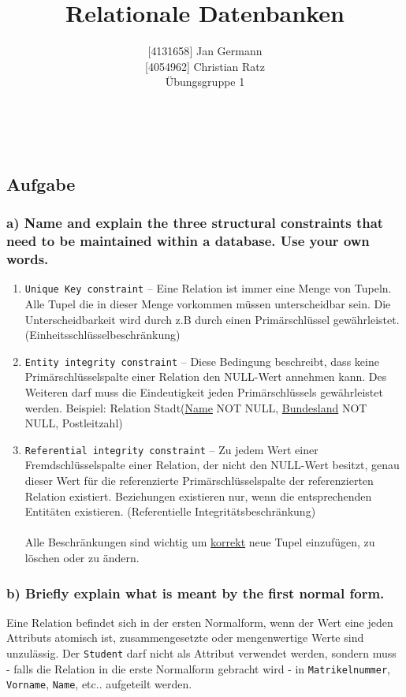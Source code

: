 \documentclass[11pt,a4paper,DIV=9]{scrartcl}
\author{{[}4131658{]} Jan Germann \\{[}4054962{]} Christian Ratz\\Übungsgruppe 1}
\title{Relationale Datenbanken}
\newcounter{temp}
\newcommand{\aufgabe}[1]{
  \setcounter{temp}{\value{subsection}}
  \setcounter{subsection}{#1}
  \addtocounter{subsection}{-1}
  \subsection{Aufgabe}
  \setcounter{subsection}{\value{temp}}
}
\newcommand{\teil}[2][]{
  \subsubsection*{#2) #1}
}
\renewcommand{\author}[1]{\renewcommand{\author}{#1}}
\renewcommand{\title}[1]{\renewcommand{\title}{#1}}
\newcommand{\makehomeworktitle}{
  \begin{minipage}[t]{6.5cm}
    \sf{\author}
  \end{minipage}
  \begin{minipage}[t]{6.5cm}
    \begin{flushright}
      \sf{\title\\\today}
    \end{flushright}
  \end{minipage}
  \\[0.2cm]
  \begin{center}
    \sf{
      \color{blue}{
        \LARGE{Aufgabenblatt \blattnr}
      }
    }
  \end{center}
  \vspace{0.1cm}
}
\begin{document}
\makehomeworktitle

\aufgabe{1}
\teil[Name and explain the three structural constraints that need to be maintained within a database. Use your own words.]{a}
 \begin{enumerate}
    \item \texttt{Unique Key constraint} -- Eine Relation ist immer eine Menge von Tupeln. Alle Tupel die in dieser Menge vorkommen m\"ussen unterscheidbar sein. Die Unterscheidbarkeit wird durch z.B durch einen Prim\"arschl\"ussel gew\"ahrleistet. (Einheitsschl\"usselbeschr\"ankung)
    \item \texttt{Entity integrity constraint} -- Diese Bedingung beschreibt, dass keine Prim\"arschl\"usselspalte einer Relation den NULL-Wert annehmen kann. Des Weiteren darf muss die Eindeutigkeit jeden Prim\"arschl\"ussels gew\"ahrleistet werden. Beispiel: Relation Stadt(\underline{Name} NOT NULL, \underline{Bundesland} NOT NULL, Postleitzahl)
    \item \texttt{Referential integrity constraint} -- Zu jedem Wert einer Fremdschl\"usselspalte einer Relation, der nicht den NULL-Wert besitzt, genau dieser Wert f\"ur die referenzierte Prim\"arschl\"usselspalte der referenzierten Relation existiert. Beziehungen existieren nur, wenn die entsprechenden Entit\"aten existieren. (Referentielle Integrit\"atsbeschr\"ankung)
    \\\\ Alle Beschr\"ankungen sind wichtig um \underline{korrekt} neue Tupel einzuf\"ugen, zu l\"oschen oder zu \"andern.
  \end{enumerate}
\teil[Briefly explain what is meant by the first normal form.]{b}
Eine Relation befindet sich in der ersten Normalform, wenn der Wert eine jeden Attributs atomisch ist, zusammengesetzte oder mengenwertige Werte sind unzul\"assig. Der \texttt{Student} darf nicht als Attribut verwendet werden, sondern muss - falls die Relation in die erste Normalform gebracht wird - in \texttt{Matrikelnummer}, \texttt{Vorname}, \texttt{Name}, etc.. aufgeteilt werden.
  
\end{document}

